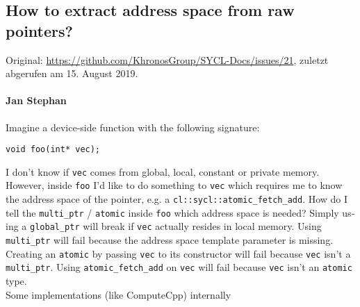 \newpage
\subsection{How to extract address space from raw pointers?}
\label{anhang:diskussionen:syclspec:addressspace}

Original: \url{https://github.com/KhronosGroup/SYCL-Docs/issues/21}, zuletzt
abgerufen am 15. August 2019.

\begin{otherlanguage}{english}
    \paragraph{Jan Stephan} Imagine a device-side function with the following
                            signature:
                            \begin{code}
                                \begin{verbatim}
void foo(int* vec);
                                \end{verbatim}
                            \end{code}
                            I don't know if \texttt{vec} comes from global,
                            local, constant or private memory. However, inside
                            \texttt{foo} I'd like to do something to
                            \texttt{vec} which requires me to know the address
                            space of the pointer, e.g. a
                            \texttt{cl::sycl::atomic\_fetch\_add}. How do I tell
                            the \texttt{multi\_ptr} / \texttt{atomic} inside
                            \texttt{foo} which address space is needed? Simply
                            using a \texttt{global\_ptr} will break if
                            \texttt{vec} actually resides in local memory. Using
                            \texttt{multi\_ptr} will fail because the address
                            space template parameter is missing. Creating an
                            \texttt{atomic} by passing \texttt{vec} to its
                            constructor will fail because \texttt{vec} isn't a
                            \texttt{multi\_ptr}. Using
                            \texttt{atomic\_fetch\_add} on \texttt{vec} will
                            fail because \texttt{vec} isn't an \texttt{atomic}
                            type.
                            \\
                            Some implementations (like ComputeCpp) internally

\end{otherlanguage}
